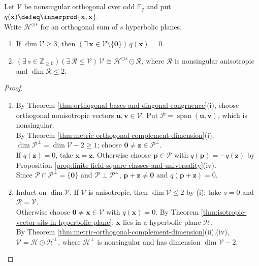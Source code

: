\begin{lemma} \label{lem:odd-finite-field-anisotropic-residue-bound} \\
Let $\mathcal{V}$ be nonsingular orthogonal over odd $\mathbb{F}_q$ and put $q(\mathbf{x})\defeq\innerprod{\mathbf{x},\mathbf{x}}$.\\
Write $\mathcal{H}^{\odot s}$ for an orthogonal sum of $s$ hyperbolic planes.
\begin{enumerate}[label=(\roman*)]
\setlength{\itemsep}{0pt}
\item If $\dim\mathcal{V}\geq3$, then $(\exists\,\mathbf{x}\in\mathcal{V}\setminus\{\mathbf{0}\})\,q(\mathbf{x})=0$.
\item $(\exists\,s\in\mathbb{Z}_{\geq0})(\exists\,\mathcal{R}\leq\mathcal{V})\,\mathcal{V}\cong\mathcal{H}^{\odot s}\odot\mathcal{R}$, where $\mathcal{R}$ is nonsingular anisotropic and $\dim\mathcal{R}\leq2$.
\end{enumerate}
\begin{proof}
\begin{enumerate}[label=(\roman*)]
\setlength{\itemsep}{0pt}
\item By Theorem \ref{thm:orthogonal-bases-and-diagonal-congruence}(i), choose orthogonal nonisotropic vectors $\mathbf{u},\mathbf{v}\in\mathcal{V}$. Put $\mathcal{P}=\operatorname{span}(\mathbf{u},\mathbf{v})$, which is nonsingular.\\
By Theorem \ref{thm:metric-orthogonal-complement-dimension}(i), $\dim\mathcal{P}^{\perp}=\dim\mathcal{V}-2\geq1$; choose $\mathbf{0}\neq\mathbf{z}\in\mathcal{P}^{\perp}$.\\
If $q(\mathbf{z})=0$, take $\mathbf{x}=\mathbf{z}$. Otherwise choose $\mathbf{p}\in\mathcal{P}$ with $q(\mathbf{p})=-q(\mathbf{z})$ by Proposition \ref{prop:finite-field-square-classes-and-universality}(iv).\\
Since $\mathcal{P}\cap\mathcal{P}^{\perp}=\{\mathbf{0}\}$ and $\mathcal{P}\perp\mathcal{P}^{\perp}$, $\mathbf{p}+\mathbf{z}\neq\mathbf{0}$ and $q(\mathbf{p}+\mathbf{z})=0$.
\item Induct on $\dim\mathcal{V}$. If $\mathcal{V}$ is anisotropic, then $\dim\mathcal{V}\leq2$ by (i); take $s=0$ and $\mathcal{R}=\mathcal{V}$.\\
Otherwise choose $\mathbf{0}\neq\mathbf{x}\in\mathcal{V}$ with $q(\mathbf{x})=0$. By Theorem \ref{thm:isotropic-vector-sits-in-hyperbolic-plane}, $\mathbf{x}$ lies in a hyperbolic plane $\mathcal{H}$.\\
By Theorem \ref{thm:metric-orthogonal-complement-dimension}(ii),(iv), $\mathcal{V}=\mathcal{H}\odot\mathcal{H}^{\perp}$, where $\mathcal{H}^{\perp}$ is nonsingular and has dimension $\dim\mathcal{V}-2$.\\

\end{enumerate}
\end{proof}
\end{lemma}
